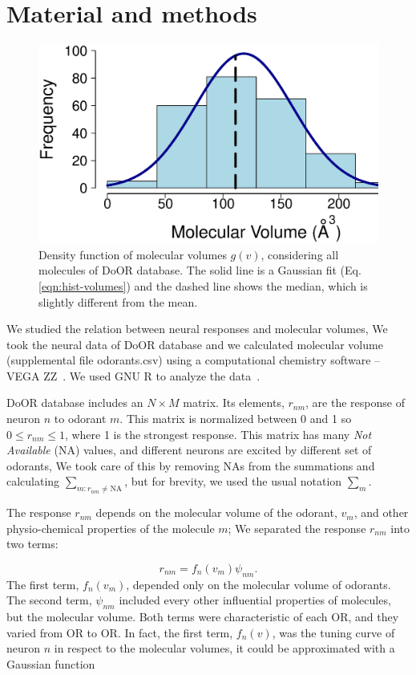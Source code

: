 \documentclass[11pt]{paper} %
\begin{document}
\section*{Material and methods}
\begin{figure}
	\centering
	\includegraphics[width=0.5 \textwidth]{hist-volumes}
	\caption{Density function of molecular volumes $g(v)$, considering all molecules of DoOR database. 
		The solid line is a Gaussian fit (Eq. \ref{eqn:hist-volumes}) and the dashed line shows the median, 
		which is slightly different from  the mean.}
	\label{fig:hist-volumes}
\end{figure}

We studied the relation between neural responses and molecular volumes, 
We took the neural data of DoOR database \cite{Galizia2010} and we calculated molecular volume (supplemental file odorants.csv) using a computational chemistry software -- VEGA ZZ~\cite{Pedretti2004}. 
We used  GNU R to analyze the data~\cite{Rlanguage}.

DoOR database includes an $N\times M$ matrix. 
Its elements, $r_{nm}$, are the response of neuron $n$ to odorant $m$. 
This matrix is normalized between 0 and 1 so $0 \le r_{nm} \le 1$, where 1 is the strongest response.
This matrix has many {\it Not Available} (NA) values, 
and different neurons are excited by different set of odorants, 
We took care of this by removing NAs from the summations and calculating $\sum_{m: r_{nm} \neq \text{NA}}$, 
but for brevity, we used the usual notation $\sum_m$.

The response $r_{nm}$ depends on the molecular volume of the odorant, $v_m$, 
and other physio-chemical properties of the molecule $m$; 
We separated the response $r_{nm}$ into two terms:

\begin{equation}
	r_{nm} = f_n(v_m) \psi_{nm}.
	\label{eqn:factors}
\end{equation}
The first term, $f_n(v_m)$, depended only on the molecular volume of odorants.
The second term, $\psi_{nm}$ included every other influential properties of molecules, but the molecular volume.
Both terms were characteristic of each OR, and they varied from OR to OR.
In fact, the first term, $f_n(v)$, was the tuning curve of neuron $n$ in respect to the molecular volumes, 
it could be approximated with a Gaussian function
\end{document}
